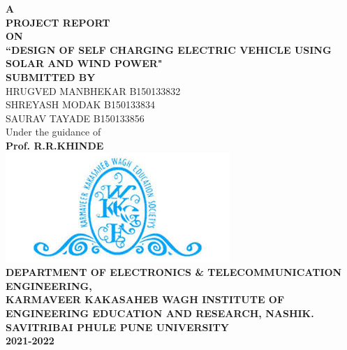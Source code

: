 \documentclass[a4paper,12pt]{article}
\begin{document}
\begin{center}
\Large\textbf{\scshape A}\\
\Large\textbf{\scshape PROJECT REPORT}\\
\Large\textbf{\scshape ON}\\[1.5cm]
\vspace{0.1in}
\LARGE\textbf{“DESIGN OF SELF CHARGING ELECTRIC VEHICLE USING SOLAR AND WIND POWER"}\\[1.5cm]
\large\textbf{SUBMITTED BY}\\[0.5cm] 
HRUGVED MANBHEKAR \hspace{6.25cm} B150133832\\[0.15cm]
SHREYASH MODAK \hspace{7.5cm} B150133834\\[0.15cm]
SAURAV TAYADE \hspace{8cm} B150133856\\[1cm]
Under the guidance of\\[0.16cm]
\Large\textbf{Prof. R.R.KHINDE}\\[0.5cm]
\includegraphics[scale=0.5]{logo.jpg}\\
\Large\textbf{\scshape DEPARTMENT OF ELECTRONICS \& TELECOMMUNICATION ENGINEERING,}\\[0.75cm]
\Large\scshape\textbf{\scshape KARMAVEER KAKASAHEB WAGH INSTITUTE OF ENGINEERING EDUCATION AND RESEARCH, NASHIK.}\\[0.75cm]
\Large\textbf{\scshape SAVITRIBAI PHULE PUNE UNIVERSITY}\\[0.75cm]
\Large\textbf{\scshape 2021-2022}\\
\end{center}
\end{document}
